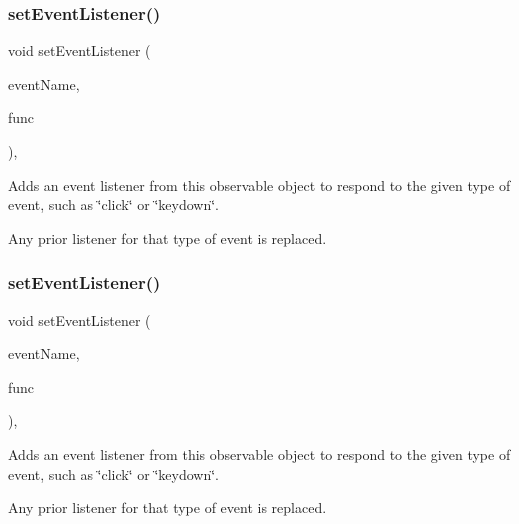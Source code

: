 \subsubsection{\texorpdfstring{set\+Event\+Listener()}{setEventListener()}\hspace{0.1cm}{\footnotesize\ttfamily [1/2]}}
{\footnotesize\ttfamily void set\+Event\+Listener (\begin{DoxyParamCaption}\item[{const std\+::string \&}]{event\+Name,  }\item[{G\+Event\+Listener}]{func }\end{DoxyParamCaption})\hspace{0.3cm}{\ttfamily [protected]}, {\ttfamily [virtual]}}



Adds an event listener from this observable object to respond to the given type of event, such as \char`\"{}click\char`\"{} or \char`\"{}keydown\char`\"{}. 

Any prior listener for that type of event is replaced. \mbox{\label{classGObservable_abac4cb9f9e626e010e87f5d91573c8a5}} 
\subsubsection{\texorpdfstring{set\+Event\+Listener()}{setEventListener()}\hspace{0.1cm}{\footnotesize\ttfamily [2/2]}}
{\footnotesize\ttfamily void set\+Event\+Listener (\begin{DoxyParamCaption}\item[{const std\+::string \&}]{event\+Name,  }\item[{G\+Event\+Listener\+Void}]{func }\end{DoxyParamCaption})\hspace{0.3cm}{\ttfamily [protected]}, {\ttfamily [virtual]}}



Adds an event listener from this observable object to respond to the given type of event, such as \char`\"{}click\char`\"{} or \char`\"{}keydown\char`\"{}. 

Any prior listener for that type of event is replaced. \mbox{\label{classGObservable_afa388d69c33c718cf035774604065604}} 
